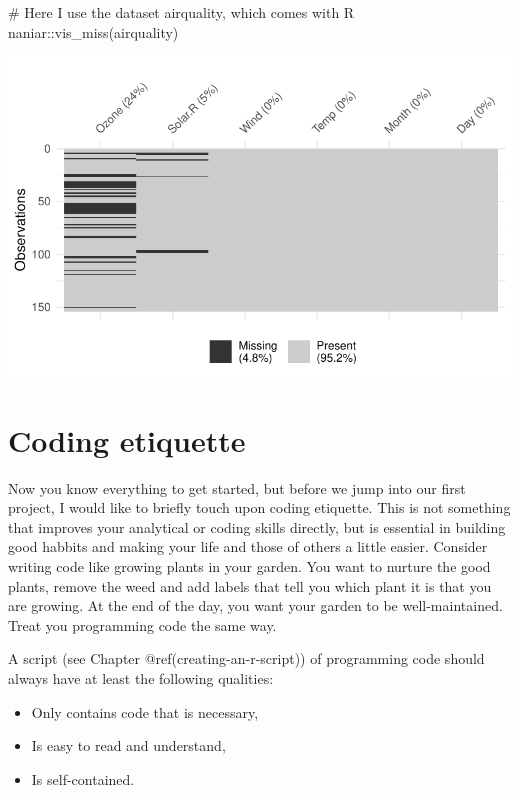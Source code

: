 \documentclass[
  letterpaper,
]{krantz}
\makeatletter
\newenvironment{Shaded}{\begin{snugshade}}{\end{snugshade}}
\newcommand{\CommentTok}[1]{\textcolor[rgb]{0.37,0.37,0.37}{#1}}
\newcommand{\FunctionTok}[1]{\textcolor[rgb]{0.28,0.35,0.67}{#1}}
\newcommand{\NormalTok}[1]{\textcolor[rgb]{0.00,0.23,0.31}{#1}}
\newcommand{\SpecialCharTok}[1]{\textcolor[rgb]{0.37,0.37,0.37}{#1}}
\newenvironment{kframe}{%
\medskip{}
\setlength{\fboxsep}{.8em}
 \def\at@end@of@kframe{}%
 \ifinner\ifhmode%
  \def\at@end@of@kframe{\end{minipage}}%
  \begin{minipage}{\columnwidth}%
 \fi\fi%
 \def\FrameCommand##1{\hskip\@totalleftmargin \hskip-\fboxsep
 \colorbox{shadecolor}{##1}\hskip-\fboxsep
     \hskip-\linewidth \hskip-\@totalleftmargin \hskip\columnwidth}%
 \MakeFramed {\advance\hsize-\width
   \@totalleftmargin\z@ \linewidth\hsize
   \@setminipage}}%
 {\par\unskip\endMakeFramed%
 \at@end@of@kframe}
\renewenvironment{Shaded}{\begin{kframe}}{\end{kframe}}
\makeatother
\begin{document}
\begin{Shaded}
\begin{Highlighting}[]
\CommentTok{\# Here I use the dataset \textquotesingle{}airquality\textquotesingle{}, which comes with R}
\NormalTok{naniar}\SpecialCharTok{::}\FunctionTok{vis\_miss}\NormalTok{(airquality)}
\end{Highlighting}
\end{Shaded}

\includegraphics{05_r_basics_files/figure-pdf/explicitly-calling-functions-1.pdf}

\section{Coding etiquette}\label{coding-etiquette}

Now you know everything to get started, but before we jump into our
first project, I would like to briefly touch upon coding etiquette. This
is not something that improves your analytical or coding skills
directly, but is essential in building good habbits and making your life
and those of others a little easier. Consider writing code like growing
plants in your garden. You want to nurture the good plants, remove the
weed and add labels that tell you which plant it is that you are
growing. At the end of the day, you want your garden to be
well-maintained. Treat you programming code the same way.

A script (see Chapter @ref(creating-an-r-script)) of programming code
should always have at least the following qualities:

\begin{itemize}
\item
  Only contains code that is necessary,
\item
  Is easy to read and understand,
\item
  Is self-contained.
\end{itemize}
\end{document}
